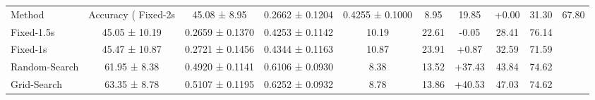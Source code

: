 \begin{tabular}{lcccccccc}
\toprule
Method & Accuracy (%
\midrule
Fixed-2s & 45.08 ± 8.95 & 0.2662 ± 0.1204 & 0.4255 ± 0.1000 & 8.95 & 19.85 & +0.00 & 31.30 & 67.80 \\
Fixed-1.5s & 45.05 ± 10.19 & 0.2659 ± 0.1370 & 0.4253 ± 0.1142 & 10.19 & 22.61 & -0.05 & 28.41 & 76.14 \\
Fixed-1s & 45.47 ± 10.87 & 0.2721 ± 0.1456 & 0.4344 ± 0.1163 & 10.87 & 23.91 & +0.87 & 32.59 & 71.59 \\
Random-Search & 61.95 ± 8.38 & 0.4920 ± 0.1141 & 0.6106 ± 0.0930 & 8.38 & 13.52 & +37.43 & 43.84 & 74.62 \\
Grid-Search & 63.35 ± 8.78 & 0.5107 ± 0.1195 & 0.6252 ± 0.0932 & 8.78 & 13.86 & +40.53 & 47.03 & 74.62 \\
\bottomrule
\end{tabular}
